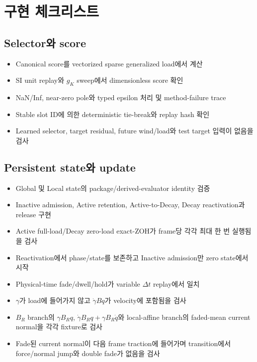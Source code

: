 \documentclass[10pt]{article}
\begin{document}
\section{구현 체크리스트}
\label{sec:r6-chapter-4}

\subsection{Selector와 score}

\begin{itemize}
  \item[$\square$] Canonical score를 vectorized sparse generalized load에서 계산
  \item[$\square$] SI unit replay와 \(g_K\) sweep에서 dimensionless score 확인
  \item[$\square$] NaN/Inf, near-zero pole와 typed epsilon 처리 및 method-failure trace
  \item[$\square$] Stable slot ID에 의한 deterministic tie-break와 replay hash 확인
  \item[$\square$] Learned selector, target residual, future wind/load와 test target 입력이 없음을 검사
\end{itemize}

\subsection{Persistent state와 update}

\begin{itemize}
  \item[$\square$] Global 및 Local state의 package/derived-evaluator identity 검증
  \item[$\square$] Inactive admission, Active retention, Active-to-Decay, Decay reactivation과 release 구현
  \item[$\square$] Active full-load/Decay zero-load exact-ZOH가 frame당 각각 최대 한 번 실행됨을 검사
  \item[$\square$] Reactivation에서 phase/state를 보존하고 Inactive admission만 zero state에서 시작
  \item[$\square$] Physical-time fade/dwell/hold가 variable \(\Delta t\) replay에서 일치
  \item[$\square$] \(\gamma\)가 load에 들어가지 않고 \(\dot\gamma Bq\)가 velocity에 포함됨을 검사
  \item[$\square$] \(B_R\) branch의 \(\gamma B_Rq\), \(\dot\gamma B_Rq+\gamma B_R\dot q\)와
  local-affine branch의 faded-mean current normal을 각각 fixture로 검사
  \item[$\square$] Fade된 current normal이 다음 frame traction에 들어가며 transition에서 force/normal jump와 double fade가 없음을 검사
\end{itemize}
\end{document}
